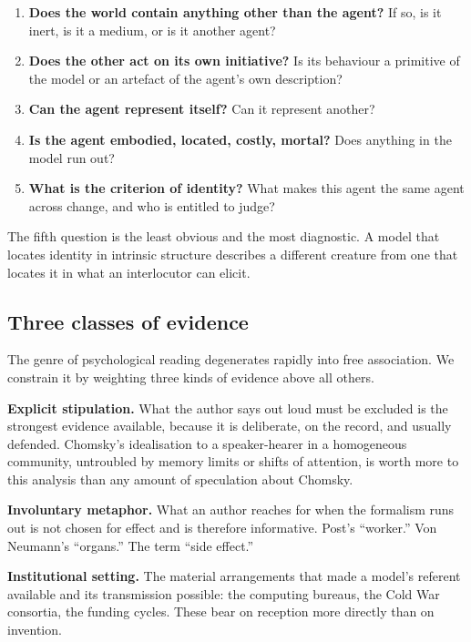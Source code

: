 \documentclass[11pt,a4paper]{article}
\begin{document}
\begin{enumerate}[label=(\roman*),leftmargin=2.2em,itemsep=0.15em]
\item \textbf{Does the world contain anything other than the agent?} If so, is it
inert, is it a medium, or is it another agent?
\item \textbf{Does the other act on its own initiative?} Is its behaviour a
primitive of the model or an artefact of the agent's own description?
\item \textbf{Can the agent represent itself?} Can it represent another?
\item \textbf{Is the agent embodied, located, costly, mortal?} Does anything in
the model run out?
\item \textbf{What is the criterion of identity?} What makes this agent the same
agent across change, and who is entitled to judge?
\end{enumerate}

The fifth question is the least obvious and the most diagnostic. A model that
locates identity in intrinsic structure describes a different creature from one
that locates it in what an interlocutor can elicit.

\subsection{Three classes of evidence}

The genre of psychological reading degenerates rapidly into free association. We
constrain it by weighting three kinds of evidence above all others.

\textbf{Explicit stipulation.} What the author says out loud must be excluded is
the strongest evidence available, because it is deliberate, on the record, and
usually defended. Chomsky's idealisation to a speaker-hearer in a homogeneous
community, untroubled by memory limits or shifts of attention, is worth more to
this analysis than any amount of speculation about Chomsky.

\textbf{Involuntary metaphor.} What an author reaches for when the formalism runs
out is not chosen for effect and is therefore informative. Post's ``worker.''
Von Neumann's ``organs.'' The term ``side effect.''

\textbf{Institutional setting.} The material arrangements that made a model's
referent available and its transmission possible: the computing bureaus, the
Cold War consortia, the funding cycles. These bear on reception more directly
than on invention.
\end{document}
